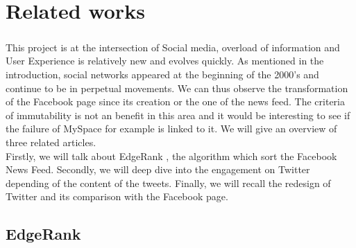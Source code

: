 \chapter*{Related works}

\paragraph{}
This project is at the intersection of Social media, overload of information and User Experience is relatively new and evolves quickly. As mentioned in the introduction, social networks appeared at the beginning of the 2000's and continue to be in perpetual movements. We can thus observe the transformation of the Facebook page since its creation or the one of the news feed. The criteria of immutability is not an benefit in this area and it would be interesting to see if the failure of MySpace for example is linked to it. We will give an overview of three related articles.\\
Firstly, we will talk about EdgeRank \cite{f_EdgeRank1}, the algorithm which sort the Facebook News Feed. Secondly, we will deep dive into the engagement on Twitter depending of the content of the tweets. Finally, we will recall the redesign of Twitter and its comparison with the Facebook page.

\section{EdgeRank}

